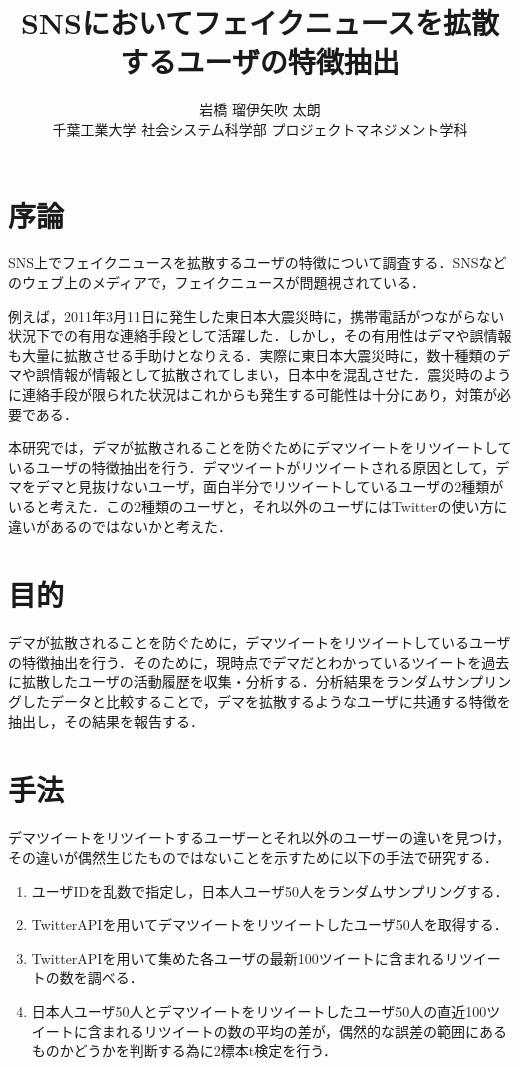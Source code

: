 \documentclass[uplatex,twocolumn]{jsarticle}
\title{\vspace{-10mm}\Large{SNSにおいてフェイクニュースを拡散するユーザの特徴抽出}\footnotemark[0]}%
\author{\large{岩橋 瑠伊\footnotemark[2]\qquad 矢吹 太朗}\\千葉工業大学 社会システム科学部 プロジェクトマネジメント学科\footnotemark[3]}%
\date{}
\begin{document}
\twocolumn[\maketitle]

\begingroup
\def\thefootnote{\fnsymbol{footnote}}
\endgroup

\section{序論}
SNS上でフェイクニュースを拡散するユーザの特徴について調査する．SNSなどのウェブ上のメディアで，フェイクニュースが問題視されている\cite{dema1}．

例えば，2011年3月11日に発生した東日本大震災時に，携帯電話がつながらない状況下での有用な連絡手段として活躍した．しかし，その有用性はデマや誤情報も大量に拡散させる手助けとなりえる．実際に東日本大震災時に，数十種類のデマや誤情報が情報として拡散されてしまい，日本中を混乱させた．震災時のように連絡手段が限られた状況はこれからも発生する可能性は十分にあり，対策が必要である\cite{dema2}．

本研究では，デマが拡散されることを防ぐためにデマツイートをリツイートしているユーザの特徴抽出を行う．デマツイートがリツイートされる原因として，デマをデマと見抜けないユーザ，面白半分でリツイートしているユーザの2種類がいると考えた．この2種類のユーザと，それ以外のユーザにはTwitterの使い方に違いがあるのではないかと考えた．

\section{目的}
デマが拡散されることを防ぐために，デマツイートをリツイートしているユーザの特徴抽出を行う．そのために，現時点でデマだとわかっているツイートを過去に拡散したユーザの活動履歴を収集・分析する．分析結果をランダムサンプリングしたデータと比較することで，デマを拡散するようなユーザに共通する特徴を抽出し，その結果を報告する．

\section{手法}
デマツイートをリツイートするユーザーとそれ以外のユーザーの違いを見つけ，その違いが偶然生じたものではないことを示すために以下の手法で研究する．
\begin{enumerate}
\item ユーザIDを乱数で指定し，日本人ユーザ50人をランダムサンプリングする．
\item TwitterAPIを用いてデマツイートをリツイートしたユーザ50人を取得する．
\item TwitterAPIを用いて集めた各ユーザの最新100ツイートに含まれるリツイートの数を調べる．
\item 日本人ユーザ50人とデマツイートをリツイートしたユーザ50人の直近100ツイートに含まれるリツイートの数の平均の差が，偶然的な誤差の範囲にあるものかどうかを判断する為に2標本t検定を行う．
\end{enumerate}
\end{document}
